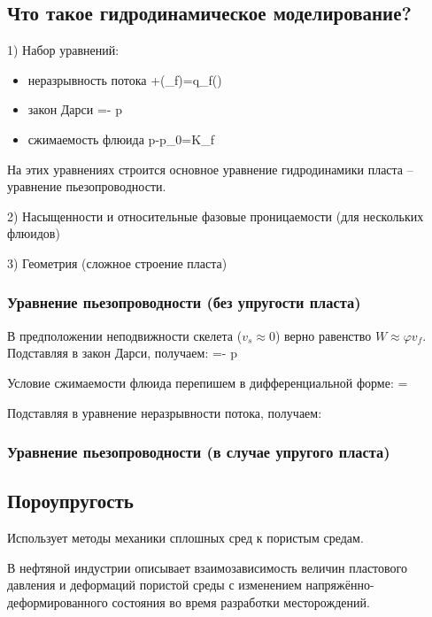 \documentclass[main.tex]{subfiles}
\begin{document}
\subsection{Что такое гидродинамическое моделирование?}
1) Набор уравнений:
\begin{itemize}
	\item неразрывность потока
	\beq
	+\pmb{\nabla}\cdot\left(\rho_f\varphi {}\right)=q_f()
	\eeq
	\item закон Дарси
	\beq
	=-\cdot\pmb{\nabla} p
	\eeq
	\item сжимаемость флюида
	\beq
	p-p_0=K_f
	\eeq
\end{itemize}

На этих уравнениях строится основное уравнение гидродинамики пласта -- уравнение пьезопроводности.

2) Насыщенности и относительные фазовые проницаемости (для нескольких флюидов)

3) Геометрия (сложное строение пласта)

\subsubsection{Уравнение пьезопроводности (без упругости пласта)}

В предположении неподвижности скелета ($v_s\approx0$) верно равенство $W\approx\varphi v_f$. Подставляя в закон Дарси, получаем:
\beq
\varphi {}=-\cdot\pmb{\nabla} p
\eeq

Условие сжимаемости флюида перепишем в дифференциальной форме:
\beq
{}=
\eeq

Подставляя в уравнение неразрывности потока, получаем:
\eeq

\subsubsection{Уравнение пьезопроводности (в случае упругого пласта)}


\subsection{Пороупругость}

Использует методы механики сплошных сред к пористым средам.

В нефтяной индустрии описывает взаимозависимость величин пластового давления и деформаций пористой среды с изменением напряжённо-деформированного состояния во время разработки месторождений.
\end{document}
